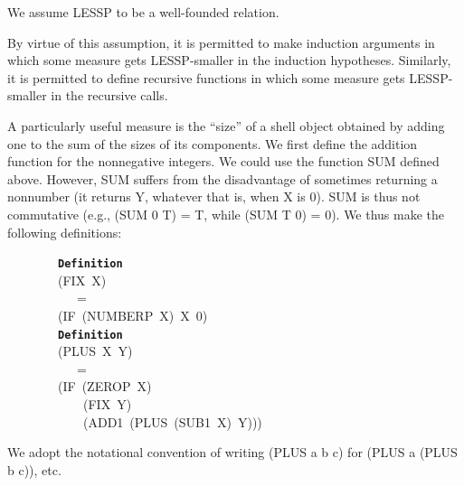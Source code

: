 \documentclass[11pt]{book}
\newenvironment{pubasis}{\begin{flushleft}\ttfamily\small}{\normalsize\rmfamily\end{flushleft}}
\newcommand{\axiomordefinition}[1]{\vspace{6pt}\texttt{\textbf{#1}}}
\begin{document}
\par\pagebreak[0]\hrulefill\nopagebreak\par
We assume LESSP to be a well-founded relation.
\nopagebreak\par\hrulefill\nopagebreak\par
By virtue of this assumption, it is permitted to make
induction arguments in which some measure
gets LESSP-smaller in the induction hypotheses.
Similarly, it is permitted to define recursive functions
in which some measure gets LESSP-smaller in the recursive calls.

A particularly useful measure is the ``size'' of a shell object 
obtained by adding one to the sum of the sizes of its components.
We first define the addition function for the
nonnegative integers.  We could use the function SUM
defined above.
However, SUM suffers from
the disadvantage of sometimes returning a nonnumber  (it returns Y, whatever
that is, when X is 0).  SUM is thus not commutative
(e.g., (SUM 0 T) = T, while (SUM T 0) = 0).  We thus make the following definitions:
\par\pagebreak[0]\hrulefill\nopagebreak\par
\begin{pubasis}
~~~~~~~~\axiomordefinition{Definition}\\
~~~~~~~~(FIX~X)\\
~~~~~~~~~~~=\\
~~~~~~~~(IF~(NUMBERP~X)~X~0)\\

~~~~~~~~\axiomordefinition{Definition}\\
~~~~~~~~(PLUS~X~Y)\\
~~~~~~~~~~~=\\
~~~~~~~~(IF~(ZEROP~X)\\
~~~~~~~~~~~~(FIX~Y)\\
~~~~~~~~~~~~(ADD1~(PLUS~(SUB1~X)~Y)))\\
\end{pubasis}
We adopt the notational convention of writing (PLUS a b c) for (PLUS a (PLUS b c)), etc.
\end{document}
